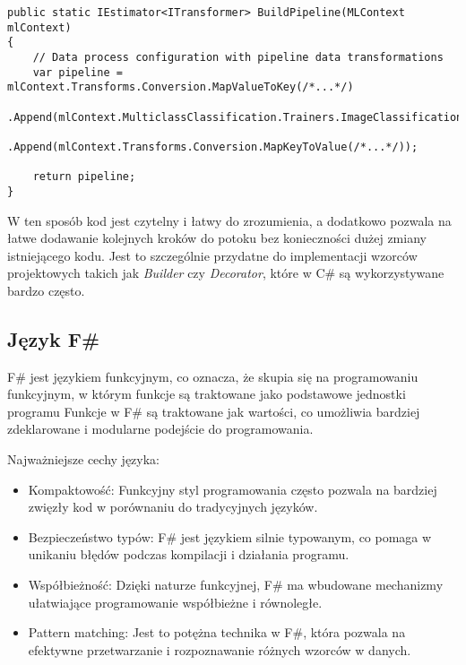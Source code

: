 \begin{lstlisting}[language={[Sharp]C}]
public static IEstimator<ITransformer> BuildPipeline(MLContext mlContext)
{
    // Data process configuration with pipeline data transformations
    var pipeline = mlContext.Transforms.Conversion.MapValueToKey(/*...*/)
        .Append(mlContext.MulticlassClassification.Trainers.ImageClassification(/*...*/))
        .Append(mlContext.Transforms.Conversion.MapKeyToValue(/*...*/));

    return pipeline;
}
\end{lstlisting}

W ten sposób kod jest czytelny i łatwy do zrozumienia, a dodatkowo pozwala na łatwe dodawanie kolejnych kroków do potoku bez konieczności dużej zmiany istniejącego kodu.
Jest to szczególnie przydatne do implementacji wzorców projektowych takich jak \emph{Builder} czy \emph{Decorator}, które w C\# są wykorzystywane bardzo często.

\subsection{Język F\#}

F\# jest językiem funkcyjnym, co oznacza, że skupia się na programowaniu funkcyjnym, w którym funkcje są traktowane jako podstawowe jednostki programu
Funkcje w F\# są traktowane jak wartości, co umożliwia bardziej zdeklarowane i modularne podejście do programowania.

Najważniejsze cechy języka:

\begin{itemize}

  \item Kompaktowość: Funkcyjny styl programowania często pozwala na bardziej zwięzły kod w porównaniu do tradycyjnych języków.

  \item Bezpieczeństwo typów: F\# jest językiem silnie typowanym, co pomaga w unikaniu błędów podczas kompilacji i działania programu.

  \item Współbieżność: Dzięki naturze funkcyjnej, F\# ma wbudowane mechanizmy ułatwiające programowanie współbieżne i równoległe.

  \item Pattern matching: Jest to potężna technika w F\#, która pozwala na efektywne przetwarzanie i rozpoznawanie różnych wzorców w danych.

\end{itemize}

